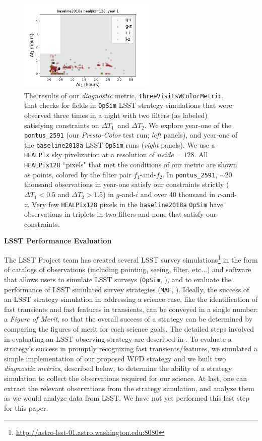 \documentclass[letterpaper,longauthor,trackchanges,twocolumn,onecolappendix,sort&compress]{aastex62}
\newcommand{\dtone}{\ensuremath{\Delta T_1}}
\newcommand{\dttwo}{\ensuremath{\Delta T_2}}
\begin{document}
\begin{figure}[!t]
\begin{center}
\includegraphics[width=6.5cm,height=4.5cm]{figures/3visits_baseline2018a_grgzriiz.png}
\caption{{The results of our {\em diagnostic} metric, {\tt threeVisitsWColorMetric}, that checks for fields in {\tt OpSim} LSST strategy simulations that were observed three times in a night with two filters (as labeled) satisfying  constraints on \dtone\ and \dttwo. We explore year-one of the {\tt pontus\_2591} (our {\em Presto-Color} test run; \emph{left} panels), and year-one of the {\tt baseline2018a} LSST {\tt OpSim} runs (\emph{right} panels). We use a {\tt HEALPix} \citep{Gorski05} sky pixelization at a resolution of $nside=128$. All {\tt HEALPix128} ``pixels" that met the conditions of our metric are shown as points, colored by the filter pair $f_1$-and-$f_2$. 
In {\tt pontus\_2591}, $\sim20$ thousand observations in year-one satisfy our constraints strictly ($\dtone<0.5$ and $\dttwo>1.5$) in $g$-and-$i$ and over 40 thousand in $r$-and-$z$.
Very few {\tt HEALPix128} pixels in the {\tt baseline2018a} {\tt OpSim} have observations in triplets in two filters and none that satisfy our constraints.}}\label{fig:metricresult}
\end{center}
\end{figure}

\appendix 

{\bf LSST Performance Evaluation}


The LSST Project team has created several LSST survey simulations\footnote{\url{http://astro-lsst-01.astro.washington.edu:8080}} in the form of catalogs of observations (including pointing, seeing, filter, etc...) and software that allows users to simulate LSST surveys ({\tt OpSim}, \citealt{opsim}), and to evaluate the performance of LSST simulated survey strategies ({\tt MAF}, \citealt{maf}). Ideally, the success of an LSST strategy simulation in addressing a science case, like the identification of fast transients and fast features in transients, can be conveyed in a single number: a \emph{Figure of Merit}, so that the overall success of a strategy can be determined by comparing the figures of merit for each science goals. %
The detailed steps involved in evaluating an LSST observing strategy are described in \citet{COSEP}. 
To evaluate a strategy's success in promptly recognizing fast transients/features, we simulated a simple implementation of our proposed WFD strategy and we built two \emph{diagnostic metrics}, described below, to determine the ability of a strategy simulation to collect the observations required for our science. At last, one can extract the relevant observations from the strategy simulation, and analyze them as we would analyze data from LSST. We have not yet performed this last step for this paper.
\end{document}
